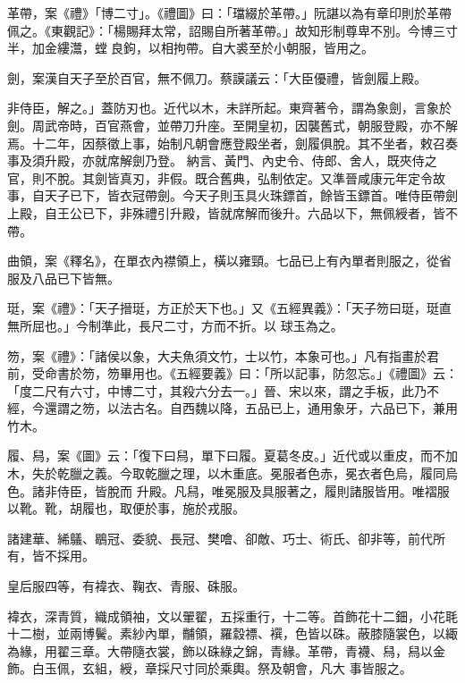 \begin{pinyinscope}
 革帶，案《禮》「博二寸」。《禮圖》曰：「璫綴於革帶。」阮諶以為有章印則於革帶佩之。《東觀記》：「楊賜拜太常，詔賜自所著革帶。」故知形制尊卑不別。今博三寸半，加金縷灊，螳良鉤，以相拘帶。自大裘至於小朝服，皆用之。



 劍，案漢自天子至於百官，無不佩刀。蔡謨議云：「大臣優禮，皆劍履上殿。



 非侍臣，解之。」蓋防刃也。近代以木，未詳所起。東齊著令，謂為象劍，言象於劍。周武帝時，百官燕會，並帶刀升座。至開皇初，因襲舊式，朝服登殿，亦不解焉。十二年，因蔡徵上事，始制凡朝會應登殿坐者，劍履俱脫。其不坐者，敕召奏事及須升殿，亦就席解劍乃登。
 納言、黃門、內史令、侍郎、舍人，既夾侍之官，則不脫。其劍皆真刃，非假。既合舊典，弘制依定。又準晉咸康元年定令故事，自天子已下，皆衣冠帶劍。今天子則玉具火珠鏢首，餘皆玉鏢首。唯侍臣帶劍上殿，自王公已下，非殊禮引升殿，皆就席解而後升。六品以下，無佩綬者，皆不帶。



 曲領，案《釋名》，在單衣內襟領上，橫以雍頸。七品已上有內單者則服之，從省服及八品已下皆無。



 珽，案《禮》：「天子搢珽，方正於天下也。」又《五經異義》：「天子笏曰珽，珽直無所屈也。」今制準此，長尺二寸，方而不折。以
 球玉為之。



 笏，案《禮》：「諸侯以象，大夫魚須文竹，士以竹，本象可也。」凡有指畫於君前，受命書於笏，笏畢用也。《五經要義》曰：「所以記事，防忽忘。」《禮圖》云：「度二尺有六寸，中博二寸，其殺六分去一。」晉、宋以來，謂之手板，此乃不經，今還謂之笏，以法古名。自西魏以降，五品已上，通用象牙，六品已下，兼用竹木。



 履、舄，案《圖》云：「復下曰舄，單下曰履。夏葛冬皮。」近代或以重皮，而不加木，失於乾臘之義。今取乾臘之理，以木重底。冕服者色赤，冕衣者色烏，履同烏色。諸非侍臣，皆脫而
 升殿。凡舄，唯冕服及具服著之，履則諸服皆用。唯褶服以靴。靴，胡履也，取便於事，施於戎服。



 諸建華、絺鸃、鶡冠、委貌、長冠、樊噲、卻敵、巧士、術氏、卻非等，前代所有，皆不採用。



 皇后服四等，有褘衣、鞠衣、青服、硃服。



 褘衣，深青質，織成領袖，文以翬翟，五採重行，十二等。首飾花十二鈿，小花毦十二樹，並兩博鬢。素紗內單，黼領，羅縠褾、襈，色皆以硃。蔽膝隨裳色，以緅為緣，用翟三章。大帶隨衣裳，飾以硃綠之錦，青緣。革帶，青襪、舄，舄以金飾。白玉佩，玄組，綬，章採尺寸同於乘輿。祭及朝會，凡大
 事皆服之。




\end{pinyinscope}
